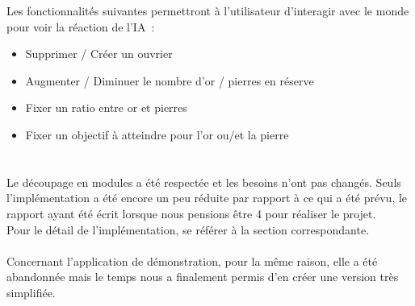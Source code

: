 Les fonctionnalités suivantes permettront à l'utilisateur d'interagir avec le monde pour voir la réaction de l'IA :
\begin{itemize}
\item Supprimer / Créer un ouvrier
\item Augmenter / Diminuer le nombre d'or / pierres en réserve
\item Fixer un ratio entre or et pierres
\item Fixer un objectif à atteindre pour l'or ou/et la pierre
\end{itemize}

\section{{\color{red}{Notes sur les besoins}}}

Le découpage en modules a été respectée et les besoins n'ont pas changés. Seuls l'implémentation a été encore un peu réduite par rapport à ce qui a été prévu, le rapport ayant été écrit lorsque nous pensions être 4 pour réaliser le projet.\\
Pour le détail de l'implémentation, se référer à la section correspondante.\\\\

Concernant l'application de démonstration, pour la même raison, elle a été abandonnée mais le temps nous a finalement permis d'en créer une version très simplifiée.

